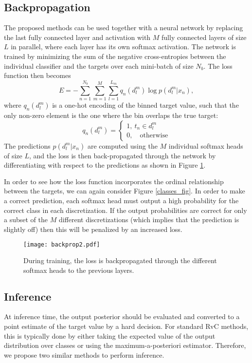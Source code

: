 \documentclass[10pt, conference, a4paper]{IEEEtran}
\begin{document}
\subsection{Backpropagation}
The proposed methods can be used together with a neural network by replacing the last fully connected layer and activation with $M$ fully connected layers of size $L$ in parallel, where each layer has its own softmax activation. The network is trained by minimizing the sum of the negative cross-entropies between the individual classifier and the targets over each mini-batch of size $N_b$. The loss function then becomes
\begin{equation}
E = - \sum_{n = 1}^{N_b} \sum_{m=1}^M \sum_{l=1}^{L_m} q_n(d_l^m) \log p(d_l^m |x_n) ,
\label{ce}
\end{equation}
where $q_n(d_l^m)$ is a one-hot encoding of the binned target value, such that the only non-zero element is the one where the bin overlaps the true target:
\begin{equation}
q_n(d_l^m) = \begin{cases}
1, \ t_n \in d_l^m \\ 
0, \quad \text{otherwise}
\end{cases}
\end{equation}
The predictions $p(d_l^m |x_n)$ are computed using the $M$ individual softmax heads of size $L$, and the loss is then back-propagated through the network by differentiating with respect to the predictions as shown in Figure \ref{backprop}.

In order to see how the loss function incorporates the ordinal relationship between the targets, we can again consider Figure \ref{classes_fig}. In order to make a correct prediction, each softmax head must output a high probability for the correct class in each discretization. If the output probabilities are correct for only a subset of the $M$ different discretizations (which implies that the prediction is slightly off) then this will be penalized by an increased loss.

\begin{figure}[t]
  \centering
  \texttt{[image: backprop2.pdf]}
  \caption{During training, the loss is backpropagated through the different softmax heads to the previous layers.}
\label{backprop}
\end{figure}

\subsection{Inference}
At inference time, the output posterior should be evaluated and converted to a point estimate of the target value by a hard decision. For standard RvC methods, this is typically done by either taking the expected value of the output distribution over classes or using the maximum-a-posteriori estimator. Therefore, we propose two similar methods to perform inference.
\end{document}

